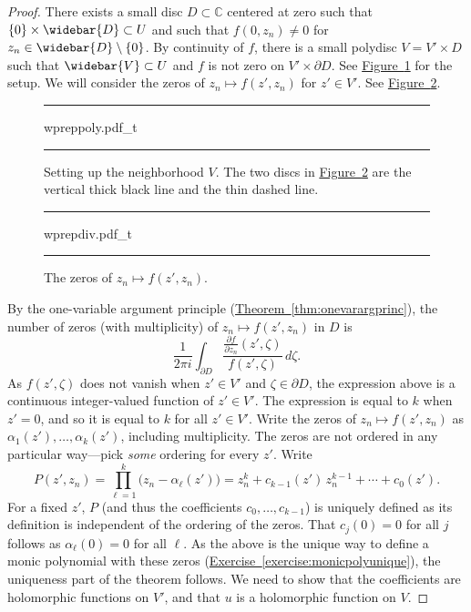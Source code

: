 \documentclass[12pt,openany]{book}
\newcommand{\C}{{\mathbb{C}}}
\theoremstyle{plain}
\theoremstyle{remark}
\theoremstyle{definition}
\newenvironment{myfig}{%
\begin{figure}[h!t]
\noindent\rule{\textwidth}{0.5pt}\vspace{12pt}\par\centering}%
{\par\noindent\rule{\textwidth}{0.5pt}
\end{figure}}
\theoremstyle{exercise}
\theoremstyle{example}
\newcommand{\figureref}[1]{\hyperref[#1]{Figure~\ref*{#1}}}
\newcommand{\exerciseref}[1]{\hyperref[#1]{Exercise~\ref*{#1}}}
\newcommand{\thmref}[1]{\hyperref[#1]{Theorem~\ref*{#1}}}
\begin{document}
\begin{proof}
There exists a small disc $D \subset \C$ centered at zero such that
$\{0\} \times \widebar{D} \subset U$ and such that
$f(0,z_n) \neq 0$ for $z_n \in \widebar{D} \setminus \{ 0 \}$.
By continuity
of $f$,
there is a small polydisc $V = V' \times D$ such that
$\widebar{V} \subset U$ and $f$ is not zero on
$V' \times \partial D$.
See \figureref{fig:wpreppoly} for the setup.
We will consider the zeros of
$z_n \mapsto f(z',z_n)$ for $z' \in V'$.  See \figureref{fig:wprepdiv}.
\begin{myfig}
{wpreppoly.pdf_t}
\caption{Setting up the neighborhood $V$.  The two discs in
\figureref{fig:wprepdiv} are the vertical thick black line and the
thin dashed line.\label{fig:wpreppoly}}
\end{myfig}
\begin{myfig}
{wprepdiv.pdf_t}
\caption{The zeros of $z_n \mapsto f(z',z_n)$.\label{fig:wprepdiv}}
\end{myfig}

By the one-variable argument principle (\thmref{thm:onevarargprinc}),
the number of zeros (with multiplicity) of $z_n \mapsto f(z',z_n)$ in $D$ is
\begin{equation*}
\frac{1}{2\pi i}
\int_{\partial D}
\frac{\frac{\partial f}{\partial z_n} (z',\zeta)}{f(z',\zeta)} \,d\zeta .
\end{equation*}
As $f(z',\zeta)$ does not vanish when $z' \in V'$ and $\zeta \in \partial
D$,
the expression above is a continuous integer-valued
function of $z' \in V'$.
The expression
is equal to $k$ when $z'=0$, and
so it is equal to $k$ for all $z' \in V'$.
Write
the zeros of $z_n \mapsto f(z',z_n)$ as $\alpha_1(z'),\ldots,\alpha_k(z')$, including
multiplicity.
The zeros are not ordered in any particular way---pick
\emph{some} ordering for every $z'$.
Write
\begin{equation*}
P(z',z_n)
=
\prod_{\ell=1}^k \bigl(z_n-\alpha_\ell(z')\bigr)
=
z_n^k + c_{k-1}(z') \, z_n^{k-1} + \cdots + c_0 (z') .
\end{equation*}
For a fixed $z'$, $P$ (and thus the coefficients $c_0,\ldots,c_{k-1}$)
is uniquely defined as its definition is independent of the ordering of the
zeros.
That $c_j(0) = 0$ for all $j$ follows as $\alpha_\ell(0)=0$ for all $\ell$.
As the above is the unique way to define a monic polynomial with these zeros
(\exerciseref{exercise:monicpolyunique}),
the uniqueness part of the theorem follows.
We need to show that the coefficients are holomorphic functions on $V'$,
and that $u$ is a holomorphic function on $V$.


\end{proof}
\end{document}
